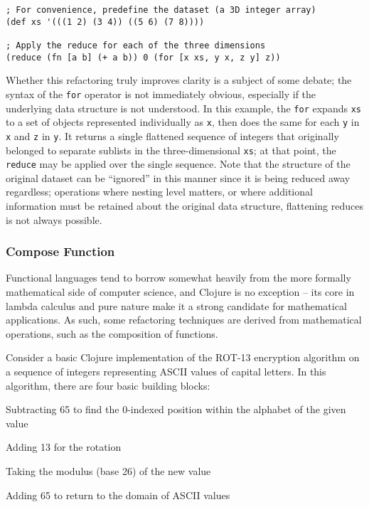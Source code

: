 \begin{verbatim}
; For convenience, predefine the dataset (a 3D integer array)
(def xs '(((1 2) (3 4)) ((5 6) (7 8))))

; Apply the reduce for each of the three dimensions
(reduce (fn [a b] (+ a b)) 0 (for [x xs, y x, z y] z))
\end{verbatim}

Whether this refactoring truly improves clarity is a subject of some debate; the syntax of the \verb!for! operator is not immediately obvious, especially if the underlying data structure is not understood. In this example, the \verb!for! expands \verb!xs! to a set of objects represented individually as \verb!x!, then does the same for each \verb!y! in \verb!x! and \verb!z! in \verb!y!. It returns a single flattened sequence of integers that originally belonged to separate sublists in the three-dimensional \verb!xs!; at that point, the \verb!reduce! may be applied over the single sequence. Note that the structure of the original dataset can be ``ignored'' in this manner since it is being reduced away regardless; operations where nesting level matters, or where additional information must be retained about the original data structure, flattening reduces is not always possible.

\subsubsection{Compose Function}

Functional languages tend to borrow somewhat heavily from the more formally mathematical side of computer science, and Clojure is no exception -- its core in lambda calculus and pure nature make it a strong candidate for mathematical applications. As such, some refactoring techniques are derived from mathematical operations, such as the composition of functions.

Consider a basic Clojure implementation of the ROT-13 encryption algorithm on a sequence of integers representing ASCII values of capital letters. In this algorithm, there are four basic building blocks:

\begin{itemize*}
\item Subtracting 65 to find the 0-indexed position within the alphabet of the given value
\item Adding 13 for the rotation
\item Taking the modulus (base 26) of the new value
\item Adding 65 to return to the domain of ASCII values
\end{itemize*}

